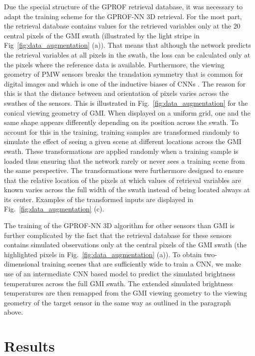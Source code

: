 \documentclass[a4paper,11pt,bibtotoc]{scrartcl}
\begin{document}
Due the special structure of the GPROF retrieval database, it was necessary to
adapt the training scheme for the GPROF-NN 3D retrieval. For the most part, the
retrieval database contains values for the retrieved variables only at the 20
central pixels of the GMI swath (illustrated by the light stripe in
Fig~\ref{fig:data_augmentation} (a)). That means that although the network
predicts the retrieval variables at all pixels in the swath, the loss can be
calculated only at the pixels where the reference data is available.
Furthermore, the viewing geometry of PMW sensors breaks the translation symmetry
that is common for digital images and which is one of the inductive biases of
CNNs \citep{goodfellow16}. The reason for this is that the distance between and
orientation of pixels varies across the swathes of the sensors. This is
illustrated in Fig.~\ref{fig:data_augmentation} for the conical viewing geometry
of GMI. When displayed on a uniform grid, one and the same shape appears
differently depending on its position across the swath. To account for this in
the training, training samples are transformed randomly to simulate the effect
of seeing a given scene at different locations across the GMI swath. These
transformations are applied randomly when a training sample is loaded thus
ensuring that the network rarely or never sees a training scene from the same
perspective. The transformations were furthermore designed to ensure that the
relative location of the pixels at which values of retrieval variables are known
varies across the full width of the swath instead of being located always at its
center. Examples of the transformed inputs are displayed in
Fig.~\ref{fig:data_augmentation} (c).

The training of the GPROF-NN 3D algorithm for other sensors than GMI is further
complicated by the fact that the retrieval database for these sensors contains
simulated observations only at the central pixels of the GMI swath (the
highlighted pixels in Fig.~\ref{fig:data_augmentation} (a)). To obtain
two-dimensional training scenes that are sufficiently wide to train a CNN, we
make use of an intermediate CNN based model to predict the simulated brightness
temperatures across the full GMI swath. The extended simulated brightness
temperatures are then remapped from the GMI viewing geometry to the viewing
geometry of the target sensor in the same way as outlined in the paragraph
above.

\section{Results}
\end{document}
